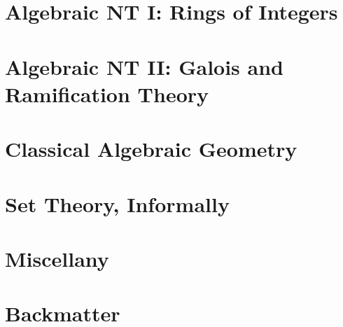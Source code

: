 \documentclass[11pt,numbers=noenddot]{scrreprt}
\begin{document}
\part{Algebraic NT I: Rings of Integers}





\part{Algebraic NT II: Galois and Ramification Theory}




\part{Classical Algebraic Geometry}

\part{Set Theory, Informally}








\part{Miscellany}
\appendix


\part{Backmatter}


\clearpage
\printbibliography



%
%
\end{document}
